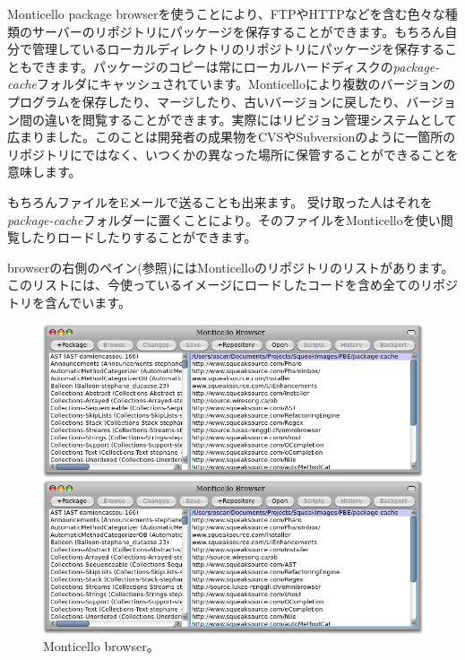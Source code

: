 \documentclass[a4paper,10pt,twoside]{book}
\begin{document}
Monticello package browserを使うことにより、FTPやHTTPなどを含む色々な種類のサーバーのリポジトリにパッケージを保存することができます。もちろん自分で管理しているローカルディレクトリのリポジトリにパッケージを保存することもできます。パッケージのコピーは常にローカルハードディスクの\emph{package-cache}フォルダにキャッシュされています。Monticelloにより複数のバージョンのプログラムを保存したり、マージしたり、古いバージョンに戻したり、バージョン間の違いを閲覧することができます。実際にはリビジョン管理システムとして広まりました。このことは開発者の成果物をCVSやSubversionのように一箇所のリポジトリにではなく、いつくかの異なった場所に保管することができることを意味します。

もちろんファイルをEメールで送ることも出来ます。
受け取った人はそれを\emph{package-cache}フォルダーに置くことにより。そのファイルをMonticelloを使い閲覧したりロードしたりすることができます。

browserの右側のペイン(参照)にはMonticelloのリポジトリのリストがあります。このリストには、今使っているイメージにロードしたコードを含め全てのリポジトリを含んでいます。
 

\begin{figure}[hbt]
\ifluluelse
	{\centerline {\includegraphics[width=\textwidth]{MonticelloBrowser}}}
	{\centerline {\includegraphics[scale=0.7]{MonticelloBrowser}}}
\caption{Monticello browser。
}
\end{figure}
\end{document}
